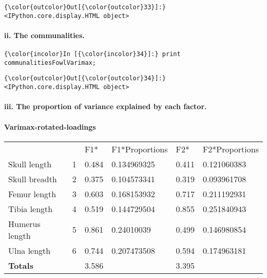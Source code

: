 \documentclass[11pt]{article}
\begin{document}
\begin{Verbatim}[commandchars=\\\{\}]
{\color{outcolor}Out[{\color{outcolor}33}]:} <IPython.core.display.HTML object>
\end{Verbatim}
            
    \hypertarget{ii.-the-communalities.}{%
\paragraph{ii. The communalities.}\label{ii.-the-communalities.}}

    \begin{Verbatim}[commandchars=\\\{\}]
{\color{incolor}In [{\color{incolor}34}]:} print communalitiesFowlVarimax;
\end{Verbatim}


\begin{Verbatim}[commandchars=\\\{\}]
{\color{outcolor}Out[{\color{outcolor}34}]:} <IPython.core.display.HTML object>
\end{Verbatim}
            
    \hypertarget{iii.-the-proportion-of-variance-explained-by-each-factor.}{%
\paragraph{iii. The proportion of variance explained by each
factor.}\label{iii.-the-proportion-of-variance-explained-by-each-factor.}}

    \hypertarget{varimax-rotated-loadings}{%
\paragraph{Varimax-rotated-loadings}\label{varimax-rotated-loadings}}

\begin{longtable}[]{@{}llllll@{}}
\toprule
\endhead
& & F1* & F1*Proportions & F2* & F2*Proportions\tabularnewline
Skull length & 1 & 0.484 & 0.134969325 & 0.411 &
0.121060383\tabularnewline
Skull breadth & 2 & 0.375 & 0.104573341 & 0.319 &
0.093961708\tabularnewline
Femur length & 3 & 0.603 & 0.168153932 & 0.717 &
0.211192931\tabularnewline
Tibia length & 4 & 0.519 & 0.144729504 & 0.855 &
0.251840943\tabularnewline
Humerus length & 5 & 0.861 & 0.24010039 & 0.499 &
0.146980854\tabularnewline
Ulna length & 6 & 0.744 & 0.207473508 & 0.594 &
0.174963181\tabularnewline
\textbf{Totals} & & 3.586 & & 3.395 &\tabularnewline
\bottomrule
\end{longtable}
\end{document}
